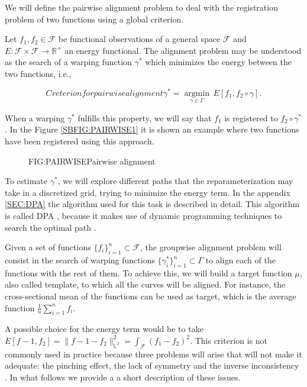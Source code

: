 
We will define the pairwise alignment problem \cite{Srivastava2016} to deal with
the registration problem of two functions using a global criterion.

Let $f_1, f_2 \in \mathcal{F}$ be functional observations of a general space
$\mathcal{F}$ and $E: \mathcal{F} \times \mathcal{F} \rightarrow \mathbb{R}^+$ an energy
functional. The alignment problem may be understood as the search of a warping
function $\gamma^*$ which minimizes the energy between the two functions, i.e.,

\begin{equation}[EQ:ENERGY]{Creterion for pairwise alignment}
\gamma^* = \underset{\gamma \in \Gamma}{ \operatorname{argmin}} \, E[f_1, f_2 \circ \gamma].
\end{equation}

When a warping $\gamma^*$ fulfills this property, we will say that $f_1$ is
registered to $f_2 \circ \gamma^*$. In the Figure \ref{SBFIG:PAIRWISE1} it is
shown an example where two functions have been registered using this approach.

\begin{figure}[Pairwise alignment]{FIG:PAIRWISE}{Pairwise alignment}
	 \quad
\end{figure}

To estimate $\gamma^*$, we will explore different paths that the
reparameterization may take in a discretized grid, trying to minimize the energy
term. In the appendix \ref{SEC:DPA} the algorithm used for this
task is described in detail. This algorithm is called DPA \cite{Srivastava2016}, because it makes use of
dynamic programming techniques to search the optimal path \cite{dpa}.

Given a set of functions $\{f_i\}_{i=1}^n \subset \mathcal{F}$, the
groupwise alignment problem will consist in the search of warping functions
$\{\gamma_i^* \}_{i=1}^n \subset \Gamma$ to align each of the functions with the
rest of them. To achieve this, we will build a target function $\mu$, also
called template, to which all the curves will be aligned. For instance,
the cross-sectional mean of the functions can be used as target, which is
the average function $\frac{1}{n}\sum_{i=1}^{n}f_i$.

A possible choice for the energy term would be to take
$E[f-1,f_2]= \|f-1 - f_2\|_{\mathbb{L}^2}^2=\int_\mathcal{F} (f_1 - f_2)^2$.
This criterion is not commonly used in practice because three
problems will arise that will not make it adequate: the pinching effect, the
lack of symmetry and the inverse inconsistency \cite{Marron2015}.
In what follows we provide a a short description of these issues.
